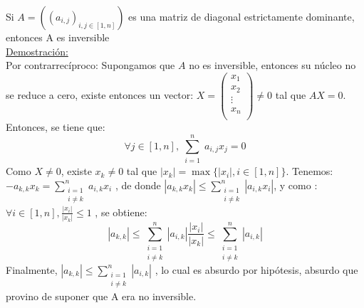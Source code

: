 Si $A=((a_{i,j})_{i,j\in [1,n]})$ es una matriz de diagonal estrictamente dominante, entonces A es inversible \\
\underline{Demostraci\'on:} \\
Por contrarrecíproco:  Supongamos que $A$ no es inversible, entonces su núcleo no se reduce a cero, existe entonces un vector: $X =	\begin{pmatrix}
							x_{1} \\
                            x_{2} \\
							\vdots \\
							x_{n} \\
						\end  {pmatrix}\not= 0 $ tal que  $AX = 0$. \newline
						\\
Entonces, se tiene que:
\begin{equation*}
\forall j \in [1,n], \displaystyle\sum_{\substack{i = 1}}^n a_{i,j} x_{j}= 0
\end{equation*}
 \newline
Como $X \not= 0$, existe $x_{k} \not= 0$ tal que
$| x_{k} |  = \max\{{ |x_{i}|, i \in [1,n] }\}$.\newline
Tenemos:  $-a_{k,k} x_{k} =  \displaystyle\sum_{\substack{i = 1\\i\neq k}}^n a_{i,k} x_{i}$ , de donde $|a_{k,k} x_{k}| \leq \displaystyle\sum_{\substack{i = 1\\i\neq k}}^n |a_{i,k} x_{i}| $,\newline
y como : $\forall i \in [1,n], \frac{\left|x_{i} \right|}{\left|x_{k}\right|} \leq 1 $ , \newline
se obtiene:
\begin{equation*}
\left| a_{k,k} \right| \leq \displaystyle\sum_{\substack{i = 1\\i\neq k}}^n |a_{i,k} |  \frac{\left|x_{i} \right|}{\left|x_{k}\right|} \leq \displaystyle\sum_{\substack{i = 1\\i\neq k}}^n |a_{i,k} |
\end{equation*}
Finalmente, $\left| a_{k,k} \right| \leq  \displaystyle\sum_{\substack{i = 1\\i\neq k}}^n |a_{i,k} |  $ , lo cual es absurdo por hip\'otesis, absurdo que provino de suponer que A era no inversible.
